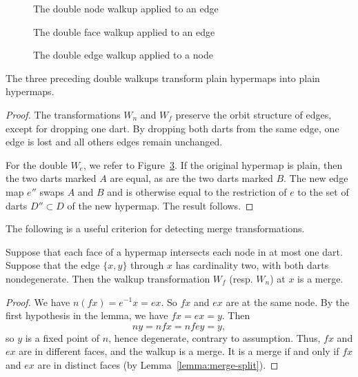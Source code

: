 \begin{figure}[htb]
  \centering
  \caption{The double node walkup applied to an edge}
  \label{fig:doublenode}
\end{figure}


\begin{figure}[htb]
  \centering
  \caption{The double face walkup applied to an edge}
  \label{fig:doubleface}
\end{figure}


\begin{figure}[htb]
  \centering
  \caption{The double edge walkup applied to a node}
  \label{fig:doubleedge}
\end{figure}


\begin{lemma}  The three preceding double walkups transform plain
hypermaps into plain hypermaps.
\end{lemma}

\begin{proof} The transformations $W_n$ and $W_f$ preserve the orbit
structure of edges, except for dropping one dart.  By dropping both
darts from the same edge, one edge is lost and all others edges
remain unchanged.

For the double $W_e$, we refer to Figure~\ref{fig:doubleedge}.  If the
original hypermap is plain, then the two darts marked $A$ are equal, as are
the two darts marked $B$.  The new edge map $e''$ swaps $A$ and $B$ and is 
otherwise equal to the restriction of $e$ to the set of darts $D''\subset D$
of the new hypermap.  The result follows.
\end{proof}

The following is a useful criterion for detecting merge
transformations.

\begin{lemma}  Suppose that each face of a hypermap intersects each node in at
most one dart.  Suppose that the edge $\{x,y\}$ through $x$ has
cardinality two, with both darts nondegenerate.  Then the walkup
transformation $W_f$ (resp. $W_n$) at $x$ is a merge.
\end{lemma}

\begin{proof} 



We have $n (f x) = e^{-1} x = e x$. So $f x$ and $e x$ are at the
same node. By the first hypothesis in the lemma, we have $f x = e x
= y$. Then $$n y  = n f x = n f e y = y,$$ so $y$ is a fixed
point of $n$, hence degenerate, contrary to assumption.  Thus, $f x$
and $e x$ are in different faces, and the walkup is a merge.
It is a merge if and only if $f x$ and $e x$ are in
distinct faces (by Lemma~\ref{lemma:merge-split}).  
\end{proof}




